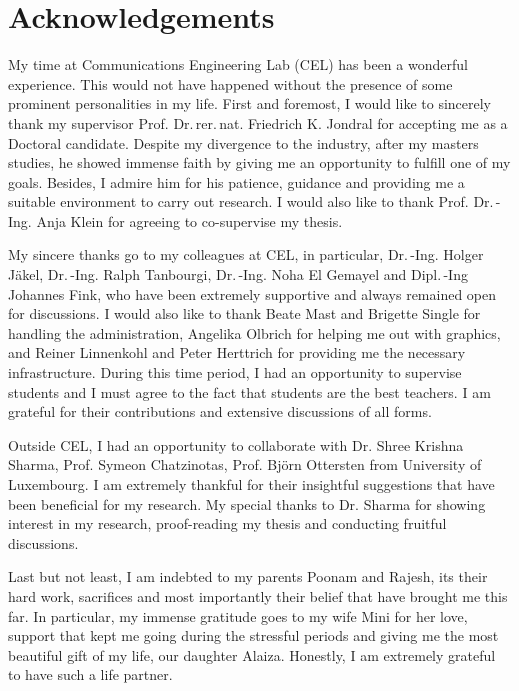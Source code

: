 \chapter*{Acknowledgements}

My time at Communications Engineering Lab (CEL) has been a wonderful experience. This would not have happened without the presence of some prominent personalities in my life. First and foremost, I would like to sincerely thank my supervisor Prof. Dr.\,rer.\,nat. Friedrich K. Jondral for accepting me as a Doctoral candidate. %
Despite my divergence to the industry, after my masters studies, he showed immense faith by giving me an opportunity to fulfill one of my goals. 
Besides, I admire him for his patience, guidance and providing me a suitable environment to carry out research. I would also like to thank Prof. Dr.\,-Ing. Anja Klein for agreeing to co-supervise my thesis.

My sincere thanks go to my colleagues at CEL, in particular, Dr.\,-Ing. Holger J\"akel, Dr.\,-Ing. Ralph Tanbourgi, Dr.\,-Ing. Noha El Gemayel and Dipl.\,-Ing Johannes Fink, who have been extremely supportive and always remained open for discussions. I would also like to thank Beate Mast and Brigette Single for handling the administration, Angelika Olbrich for helping me out with graphics, and Reiner Linnenkohl and Peter Herttrich for providing me the necessary infrastructure. During this time period, I had an opportunity to supervise students and I must agree to the fact that students are the best teachers. I am grateful for their contributions and extensive discussions of all forms. 

Outside CEL, I had an opportunity to collaborate with Dr. Shree Krishna Sharma, Prof. Symeon Chatzinotas, Prof. Bj\"orn Ottersten from University of Luxembourg. I am extremely thankful for their insightful suggestions that have been beneficial for my research. My special thanks to Dr. Sharma for showing interest in my research, proof-reading my thesis and conducting fruitful discussions. 

Last but not least, I am indebted to my parents Poonam and Rajesh, its their hard work, sacrifices and most importantly their belief that have brought me this far. In particular, my immense gratitude goes to my wife Mini for her love, support that kept me going during the stressful periods and giving me the most beautiful gift of my life, our daughter Alaiza. Honestly, I am extremely grateful to have such a life partner. 
